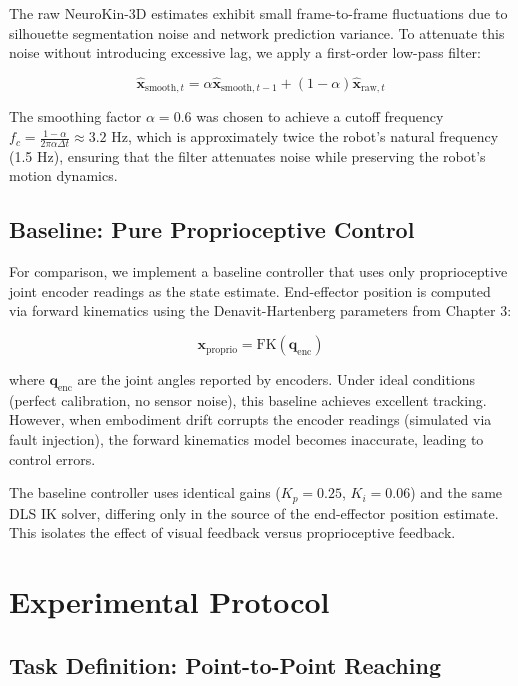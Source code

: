 ﻿\documentclass[12pt,a4paper,oneside]{report}
\begin{document}
The raw NeuroKin-3D estimates exhibit small frame-to-frame fluctuations due to silhouette segmentation noise and network prediction variance. To attenuate this noise without introducing excessive lag, we apply a first-order low-pass filter:

\begin{equation}
\hat{\mathbf{x}}_{\text{smooth},t} = \alpha \hat{\mathbf{x}}_{\text{smooth},t-1} + (1 - \alpha) \hat{\mathbf{x}}_{\text{raw},t}
\end{equation}

The smoothing factor $\alpha = 0.6$ was chosen to achieve a cutoff frequency $f_c = \frac{1-\alpha}{2\pi \alpha \Delta t} \approx 3.2$ Hz, which is approximately twice the robot's natural frequency (1.5 Hz), ensuring that the filter attenuates noise while preserving the robot's motion dynamics.

\subsection{Baseline: Pure Proprioceptive Control}

For comparison, we implement a baseline controller that uses only proprioceptive joint encoder readings as the state estimate. End-effector position is computed via forward kinematics using the Denavit-Hartenberg parameters from Chapter 3:

\begin{equation}
\mathbf{x}_{\text{proprio}} = \text{FK}(\mathbf{q}_{\text{enc}})
\end{equation}

where $\mathbf{q}_{\text{enc}}$ are the joint angles reported by encoders. Under ideal conditions (perfect calibration, no sensor noise), this baseline achieves excellent tracking. However, when embodiment drift corrupts the encoder readings (simulated via fault injection), the forward kinematics model becomes inaccurate, leading to control errors.

The baseline controller uses identical gains ($K_p = 0.25$, $K_i = 0.06$) and the same DLS IK solver, differing only in the source of the end-effector position estimate. This isolates the effect of visual feedback versus proprioceptive feedback.

\section{Experimental Protocol}

\subsection{Task Definition: Point-to-Point Reaching}
\end{document}

